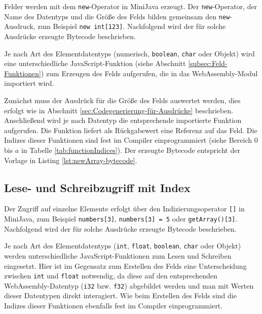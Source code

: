 Felder werden mit dem \lstinline{new}-Operator in MiniJava erzeugt. Der \lstinline{new}-Operator, der Name des Datentyps und die Größe des Felds bilden gemeinsam den \lstinline{new}-Ausdruck, zum Beispiel \lstinline{new int[123]}. Nachfolgend wird der für solche Ausdrücke erzeugte Bytecode beschrieben.

Je nach Art des Elementdatentyps (numerisch, \lstinline{boolean}, \lstinline{char} oder Objekt) wird eine unterschiedliche JavaScript-Funktion (siehe Abschnitt \ref{subsec:Feld-Funktionen}) zum Erzeugen des Felds aufgerufen, die in das WebAssembly-Modul importiert wird.

Zunächst muss der Ausdrück für die Größe des Felds auswertet werden, dies erfolgt wie in Abschnitt \ref{sec:Codegenerierung-für-Ausdrücke} beschrieben. Anschließend wird je nach Datentyp die entsprechende importierte Funktion aufgerufen. Die Funktion liefert als Rückgabewert eine Referenz auf das Feld. Die Indizes dieser Funktionen sind fest im Compiler einprogrammiert (siehe Bereich $0$ bis $a$ in Tabelle \ref{tab:functionIndices}). Der erzeugte Bytecode entspricht der Vorlage in Listing \ref{lst:newArray-bytecode}.



\subsection{Lese- und Schreibzugriff mit Index}
\label{subsec:Lese-und-Schreibzugriff-mit-Index}

Der Zugriff auf einzelne Elemente erfolgt über den Indizierungsoperator \lstinline{[]} in MiniJava, zum Beispiel \lstinline{numbers[3]}, \lstinline{numbers[3] = 5} oder \lstinline{getArray()[3]}. Nachfolgend wird der für solche Ausdrücke erzeugte Bytecode beschrieben.

Je nach Art des Elementdatentyps (\lstinline{int}, \lstinline{float}, \lstinline{boolean}, \lstinline{char} oder Objekt) werden unterschiedliche JavaScript-Funktionen zum Lesen und Schreiben eingesetzt. Hier ist im Gegensatz zum Erstellen des Felds eine Unterscheidung zwischen \lstinline{int} und \lstinline{float} notwendig, da diese auf den entsprechenden WebAssembly-Datentyp (\lstinline{i32} bzw. \lstinline{f32}) abgebildet werden und man mit Werten dieser Datentypen direkt interagiert. Wie beim Erstellen des Felds sind die Indizes dieser Funktionen ebenfalls fest im Compiler einprogrammiert.

